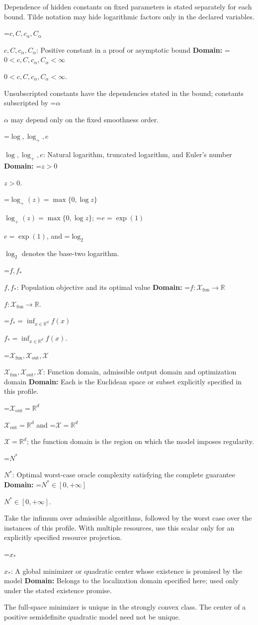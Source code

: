 \documentclass[10pt,a4paper]{article}
\newcommand{\AtlasMath}[1]{\par\begingroup\centering\setbox0=\hbox{$\displaystyle #1$}\ifdim\wd0>1.4\linewidth\typeout{ATLAS WIDE FORMULA: \the\wd0}\fi\ifdim\wd0>\linewidth\resizebox{\linewidth}{!}{\box0}\else\box0\fi\par\endgroup}
\newcommand{\AtlasInlineMath}[1]{\begingroup\setbox0=\hbox{$#1$}\ifdim\wd0>.4\linewidth\endgroup\AtlasMath{#1}\else\endgroup$#1$\fi}
\begin{document}
Dependence of hidden constants on fixed parameters is stated separately for each bound. Tilde notation may hide logarithmic factors only in the declared variables.

\AtlasInlineMath{c,C,c_\alpha,C_\alpha}: Positive constant in a proof or asymptotic bound \textbf{Domain:} \AtlasInlineMath{0<c,C,c_\alpha,C_\alpha<\infty}.

Unsubscripted constants have the dependencies stated in the bound; constants subscripted by \AtlasInlineMath{\alpha} may depend only on the fixed smoothness order.

\AtlasInlineMath{\log,\log_+,e}: Natural logarithm, truncated logarithm, and Euler's number \textbf{Domain:} \AtlasInlineMath{z>0}.

\AtlasInlineMath{\log_+(z)=\max\{0,\log z\}}; \AtlasInlineMath{e=\exp(1)}, and \AtlasInlineMath{\log_2} denotes the base-two logarithm.

\AtlasInlineMath{f,f_*}: Population objective and its optimal value \textbf{Domain:} \AtlasInlineMath{f:\mathcal{X}_{\mathrm{fun}}\to\mathbb{R}}.

\AtlasInlineMath{f_*=\inf_{x\in \mathbb{R}^d}f(x)}.

\AtlasInlineMath{\mathcal{X}_{\mathrm{fun}},\mathcal{X}_{\mathrm{out}},\mathcal{X}}: Function domain, admissible output domain and optimization domain \textbf{Domain:} Each is the Euclidean space or subset explicitly specified in this profile.

\AtlasInlineMath{\mathcal{X}_{\mathrm{out}}=\mathbb{R}^d} and \AtlasInlineMath{\mathcal{X}=\mathbb{R}^d}; the function domain is the region on which the model imposes regularity.

\AtlasInlineMath{N^*}: Optimal worst-case oracle complexity satisfying the complete guarantee \textbf{Domain:} \AtlasInlineMath{N^*\in[0,+\infty]}.

Take the infimum over admissible algorithms, followed by the worst case over the instances of this profile. With multiple resources, use this scalar only for an explicitly specified resource projection.

\AtlasInlineMath{x_*}: A global minimizer or quadratic center whose existence is promised by the model \textbf{Domain:} Belongs to the localization domain specified here; used only under the stated existence promise.

The full-space minimizer is unique in the strongly convex class. The center of a positive semidefinite quadratic model need not be unique.
\end{document}
